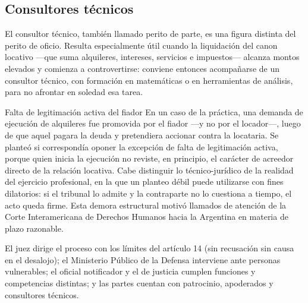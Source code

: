 \documentclass[12pt,oneside]{book}
\begin{document}
\subsection{Consultores técnicos}

El consultor técnico, también llamado perito de parte, es una figura distinta del perito de oficio. Resulta especialmente útil cuando la liquidación del canon locativo ---que suma alquileres, intereses, servicios e impuestos--- alcanza montos elevados y comienza a controvertirse: conviene entonces acompañarse de un consultor técnico, con formación en matemáticas o en herramientas de análisis, para no afrontar en soledad esa tarea.

\begin{example}{Falta de legitimación activa del fiador}
En un caso de la práctica, una demanda de ejecución de alquileres fue promovida por el fiador ---y no por el locador---, luego de que aquel pagara la deuda y pretendiera accionar contra la locataria. Se planteó si correspondía oponer la excepción de falta de legitimación activa, porque quien inicia la ejecución no reviste, en principio, el carácter de acreedor directo de la relación locativa. Cabe distinguir lo técnico-jurídico de la realidad del ejercicio profesional, en la que un planteo débil puede utilizarse con fines dilatorios: si el tribunal lo admite y la contraparte no lo cuestiona a tiempo, el acto queda firme. Esta demora estructural motivó llamados de atención de la Corte Interamericana de Derechos Humanos hacia la Argentina en materia de plazo razonable.
\end{example}

\begin{sintesis}
El juez dirige el proceso con los límites del artículo 14 (sin recusación sin causa en el desalojo); el Ministerio Público de la Defensa interviene ante personas vulnerables; el oficial notificador y el de justicia cumplen funciones y competencias distintas; y las partes cuentan con patrocinio, apoderados y consultores técnicos.
\end{sintesis}
\end{document}
